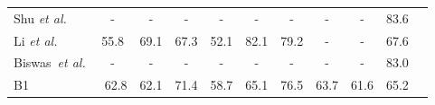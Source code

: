 \documentclass[9pt,journal,letterpaper,twocolumn]{IEEEtran}
\begin{document}
{\begin{table}[!t]
{\begin{tabular}{lcccccccccc}
			\hspace{-0.5em}Shu \emph{et al.} \cite{shu2016cern}\hspace{-0.5em}                 &\hspace{-0.5em} - \hspace{-0.5em}            & -             & -             & -             & -             & -             & -             & -               & \hspace{-0.5em}83.6\hspace{-0.7em} \\
			\hspace{-0.5em}Li \em{et al.} \cite{li2017sbgar}\hspace{-0.5em}                  & \hspace{-0.5em}55.8\hspace{-0.5em}          & \hspace{-0.5em}69.1 \hspace{-0.5em}         & \hspace{-0.5em}67.3\hspace{-0.5em}          & \hspace{-0.5em}52.1\hspace{-0.5em}          & \hspace{-0.5em}82.1\hspace{-0.5em}          & \hspace{-0.5em}79.2\hspace{-0.5em}          & -             & -               & \hspace{-0.5em}67.6\hspace{-0.7em} \\
			\hspace{-0.5em}Biswas~\!\em{et al.}\cite{biswas2018structural}\hspace{-0.5em}                 & -             & -             & -             & -             & -             & -             & -             & -               & \hspace{-0.5em}83.0\hspace{-0.5em} \\
			\hline
			\hspace{-0.5em}B1 & \hspace{-0.5em}~62.8\hspace{-0.5em}&	\hspace{-0.5em}62.1\hspace{-0.5em}&	\hspace{-0.5em}71.4\hspace{-0.5em}	&\hspace{-0.5em}58.7\hspace{-0.5em}	&\hspace{-0.5em}65.1\hspace{-0.5em}&	\hspace{-0.5em}76.5\hspace{-0.5em}&	\hspace{-0.5em}63.7\hspace{-0.5em}&	\hspace{-0.5em}61.6\hspace{-0.5em}&	\hspace{-0.5em}65.2\hspace{-0.5em}

\end{tabular}}
\end{table}}
\end{document}
